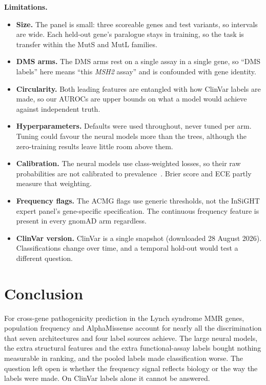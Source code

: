 \documentclass[11pt]{article}
\newcommand{\gene}[1]{\textit{#1}}
\begin{document}
\textbf{Limitations.}
\begin{itemize}
\item \textbf{Size.} The panel is small: three scoreable genes and \nLabelledScoreable{}
  test variants, so intervals are wide. Each held-out gene's paralogue stays in training,
  so the task is transfer within the MutS and MutL families.
\item \textbf{DMS arms.} The DMS arms rest on a single assay in a single gene, so ``DMS
  labels'' here means ``this \gene{MSH2} assay'' and is confounded with gene identity.
\item \textbf{Circularity.} Both leading features are entangled with how ClinVar labels
  are made, so our AUROCs are upper bounds on what a model would achieve against
  independent truth.
\item \textbf{Hyperparameters.} Defaults were used throughout, never tuned per arm. Tuning
  could favour the neural models more than the trees, although the zero-training results
  leave little room above them.
\item \textbf{Calibration.} The neural models use class-weighted losses, so their raw
  probabilities are not calibrated to prevalence~\citep{guo2017calibration}. Brier score
  and ECE partly measure that weighting.
\item \textbf{Frequency flags.} The ACMG flags use generic thresholds, not the InSiGHT
  expert panel's gene-specific specification. The continuous frequency feature is
  present in every gnomAD arm regardless.
\item \textbf{ClinVar version.} ClinVar is a single snapshot (downloaded 28 August 2026).
  Classifications change over time, and a temporal hold-out would test a different
  question.
\end{itemize}

\section{Conclusion}

For cross-gene pathogenicity prediction in the Lynch syndrome MMR genes, population
frequency and AlphaMissense account for nearly all the discrimination that seven
architectures and four label sources achieve. The large neural models, the extra
structural features and the extra functional-assay labels bought nothing measurable in
ranking, and the pooled labels made classification worse. The question left open is
whether the frequency signal reflects biology or the way the labels were made. On ClinVar
labels alone it cannot be answered.
\end{document}
